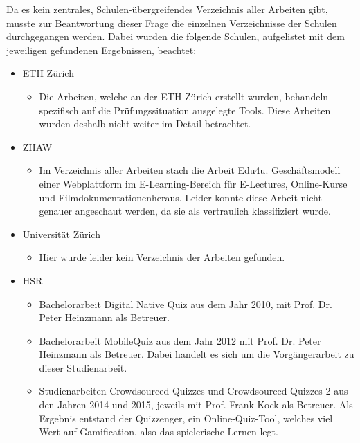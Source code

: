 Da es kein zentrales, Schulen-übergreifendes Verzeichnis aller Arbeiten gibt, musste zur Beantwortung dieser Frage die einzelnen Verzeichnisse der Schulen durchgegangen werden. Dabei wurden die folgende Schulen, aufgelistet mit dem jeweiligen gefundenen Ergebnissen, beachtet:
\begin{itemize}
	\item ETH Zürich
	\begin{itemize}
		\item Die Arbeiten, welche an der ETH Zürich erstellt wurden, behandeln spezifisch auf die Prüfungssituation ausgelegte Tools. Diese Arbeiten wurden deshalb nicht weiter im Detail betrachtet. \cite{zeller_automated_2014} \cite{antonucci_autoteach_2014} \cite{heinrich_design_2008} \cite{nanzer_einsatz_2005}
	\end{itemize}
	\item ZHAW
	\begin{itemize}
		\item Im Verzeichnis aller Arbeiten stach die Arbeit \glqq Edu4u. Geschäftsmodell einer Webplattform im E-Learning-Bereich für E-Lectures, Online-Kurse und Filmdokumentationen\grqq heraus. Leider konnte diese Arbeit nicht genauer angeschaut werden, da sie als vertraulich klassifiziert wurde. \cite{_bachelorarbeiten-2013-zhaw-sml.pdf_}
	\end{itemize}
	\item Universität Zürich
	\begin{itemize}
		\item Hier wurde leider kein Verzeichnis der Arbeiten gefunden.
	\end{itemize}
	\item HSR
	\begin{itemize}
		\item Bachelorarbeit \glqq Digital Native Quiz\grqq \cite{grob_digital_2010} aus dem Jahr 2010, mit Prof. Dr. Peter Heinzmann als Betreuer.
		\item Bachelorarbeit \glqq MobileQuiz\grqq \cite{khalid_bachelorarbeit_mobile_quiz_juni_2012.pdf_2012} aus dem Jahr 2012 mit Prof. Dr. Peter Heinzmann als Betreuer. Dabei handelt es sich um die Vorgängerarbeit zu dieser Studienarbeit.
		\item Studienarbeiten \glqq Crowdsourced Quizzes\grqq \cite{_technischer_bericht-quizzenger_crowdsourced_quizzes.pdf_} und \glqq Crowdsourced Quizzes 2\grqq \cite{_technischer_bericht-quizzenger-2.pdf_} aus den Jahren 2014 und 2015, jeweils mit Prof. Frank Kock als Betreuer. Als Ergebnis entstand der Quizzenger, ein Online-Quiz-Tool, welches viel Wert auf Gamification, also das spielerische Lernen legt.
	\end{itemize}
\end{itemize}


